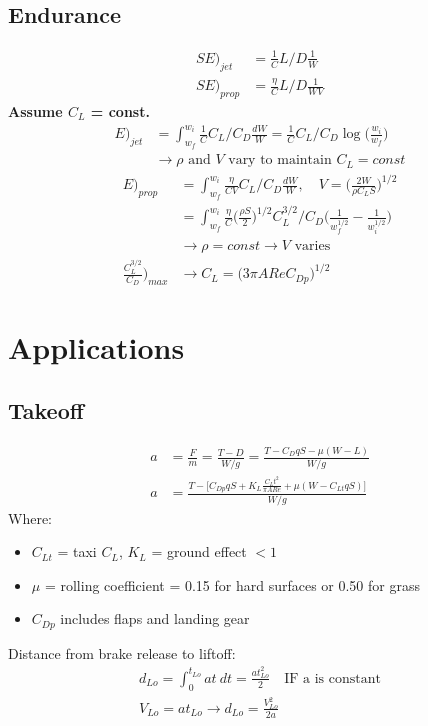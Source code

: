 \documentclass[draft=false, titlepage]{article}
\begin{document}
\subsection{Endurance}
\begin{align}
SE\big)_{jet} &= \frac{1}{C} L/D \frac{1}{W}\\
SE\big)_{prop} &= \frac{\eta}{C} L/D \frac{1}{WV}
\end{align}
\textbf{Assume $C_L$ = const.}
\begin{align*}
E\big)_{jet} &= \int_{w_f}^{w_i} \frac{1}{C} C_L/C_D \frac{dW}{W} = \frac{1}{C} C_L/C_D \log\Big(\frac{w_i}{w_f}\Big)\\
&\rightarrow \rho \text{ and } V \text{ vary to maintain } C_L = const
\end{align*}
\begin{align*}
E\big)_{prop} &= \int_{w_f}^{w_i} \frac{\eta}{CV} C_L/C_D \frac{dW}{W},\quad V = \Big(\frac{2W}{\rho C_L S}\Big)^{1/2}\\
&= \int_{w_f}^{w_i} \frac{\eta}{C} \Big(\frac{\rho S}{2}\Big)^{1/2} C_L^{3/2}/C_D \Big(\frac{1}{w_f^{1/2}} - \frac{1}{w_i^{1/2}}\Big)\\
&\rightarrow \rho = const \rightarrow V \text{ varies}\\
\frac{C_L^{3/2}}{C_D}\Big)_{max} &\rightarrow C_L = \big(3\pi AR e C_{Dp}\big)^{1/2}
\end{align*}

\section{Applications}
\subsection{Takeoff}
\begin{align*}
a &= \frac{F}{m} = \frac{T-D}{W/g} = \frac{T-C_DqS-\mu(W-L)}{W/g}\\
a &= \frac{ T - \big[ C_{Dp} qS + K_L \frac{C_{L}t^2}{\pi AR e} + \mu (W-C_{Lt}qS) \big] }{W/g}
\end{align*}
Where:
\begin{itemize}
	\item $C_{Lt}$ = taxi $C_L$, $K_L$ = ground effect $< 1$
	\item $\mu$ = rolling coefficient = 0.15 for hard surfaces or 0.50 for grass
	\item $C_{Dp}$ includes flaps and landing gear
\end{itemize}
Distance from brake release to liftoff:
\begin{gather*}
d_{Lo} = \int_0^{t_{Lo}} at\ dt = \frac{at^2_{Lo}}{2} \quad \text{IF a is constant}\\
V_{Lo} = at_{Lo} \rightarrow d_{Lo} = \frac{V_{Lo}^2}{2a}
\end{gather*}
\end{document}
